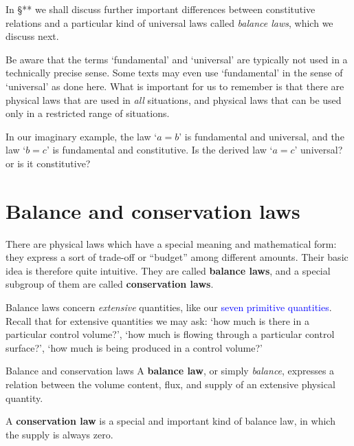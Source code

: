 \documentclass[a4paper,12pt,%
onecolumn,oneside,%
british%
]{memoir}
\renewcommand*{\|}[1][]{\nonscript\:#1\vert\nonscript\:\mathopen{}}
\newcommand*{\sect}{\S}%
\renewcommand*{\autoref}[2]{\sidepar{\vspace{-1ex}\footnotesize{\color{blue}\faIcon{%
angle-right%
}\enskip\sect~\ref{#1} page~\pageref{#1}}}\textcolor{blue}{#2}}
\begin{document}
\medskip

In \sect*** we shall discuss further important differences between constitutive relations and a particular kind of universal laws called \emph{balance laws}, which we discuss next.


\begin{warning}
  Be aware that the terms \enquote*{fundamental} and \enquote*{universal} are typically not used in a technically precise sense. Some texts may even use \enquote*{fundamental} in the sense of \enquote*{universal} as done here. What is important for us to remember is that there are physical laws that are used in \emph{all} situations, and physical laws that can be used only in a restricted range of situations.
\end{warning}

\begin{exercise}
  In our imaginary example, the law \enquote*{$a=b$} is fundamental and universal, and the law \enquote*{$b=c$} is fundamental and constitutive. Is the derived law \enquote*{$a=c$} universal? or is it constitutive?
\end{exercise}

\section{Balance and conservation laws}
\label{sec:balance_intro}

There are physical laws which have a special meaning and mathematical form: they express a sort of trade-off or \enquote{budget} among different amounts. Their basic idea is therefore quite intuitive. They are called \textbf{balance laws}, and a special subgroup of them are called \textbf{conservation laws}.

Balance laws concern \emph{extensive} quantities, like our \autoref{sec:stuff}{seven primitive quantities}. Recall that for extensive quantities we may ask: \enquote*{how much is there in a particular control volume?}, \enquote*{how much is flowing through a particular control surface?}, \enquote*{how much is being produced in a control volume?}
\begin{definition}{Balance and conservation laws}
  A \textbf{balance law}, or simply \emph{balance}, expresses a relation between the volume content, flux, and supply of an extensive physical quantity.

  \smallskip

  A \textbf{conservation law} is a special and important kind of balance law, in which the supply is always zero.
\end{definition}
\end{document}
